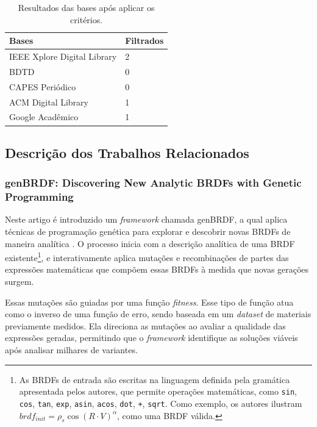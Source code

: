\begin{table}[H]
\ABNTEXfontereduzida
  \caption{\small Resultados das bases após aplicar os critérios.}
\label{tab-result}
\begin{tabular}{p{6.6cm}|p{6.6cm}}
   \textbf{Bases}  & \textbf{Filtrados}\\
   \hline
    IEEE Xplore Digital Library
   & 2
    \\ \hline
    BDTD
    & 0
    \\ \hline
    CAPES Periódico
    & 0
    \\ \hline


  ACM Digital Library
  & 1
    \\ \hline
 Google Acadêmico
  & 1
\end{tabular}
\end{table}





\subsection{Descrição dos Trabalhos Relacionados}


\subsubsection{genBRDF: Discovering New Analytic BRDFs with Genetic Programming}


Neste artigo é introduzido um \textit{framework} chamada genBRDF, a qual aplica técnicas de programação genética para explorar e descobrir novas BRDFs de maneira analítica \cite{genbrdf}. O processo inicia com a descrição analítica de uma BRDF existente\footnote{As BRDFs de entrada são escritas na linguagem definida pela gramática apresentada pelos autores, que permite operações matemáticas, como \verb"sin", \verb"cos", \verb"tan", \verb"exp", \verb"asin", \verb"acos", \verb"dot", \verb"+", \verb"sqrt". Como exemplo, os autores ilustram ${brdf}_{init} = \rho_s \cos(R \cdot V)^\alpha$, como uma BRDF válida.}, e interativamente aplica mutações e recombinações de partes das expressões matemáticas que compõem essas BRDFs à medida que novas gerações surgem.

Essas mutações são guiadas por uma função \textit{fitness}.
Esse tipo de função atua como o inverso de uma função de erro, sendo baseada em um \textit{dataset} de materiais previamente medidos. Ela direciona as mutações ao avaliar a qualidade das expressões geradas, permitindo que o \textit{framework} identifique as soluções viáveis após analisar milhares de variantes.

